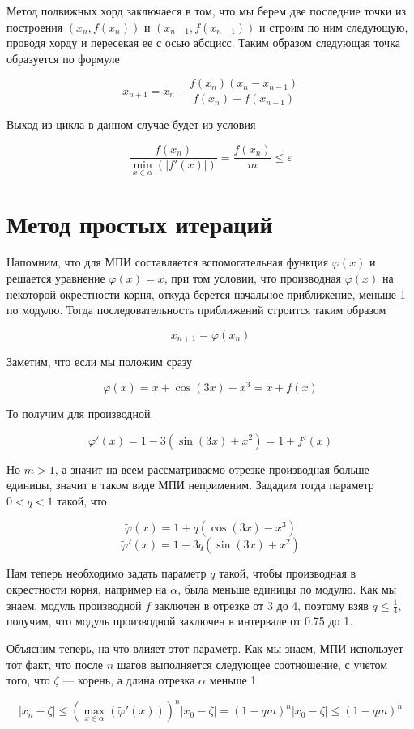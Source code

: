 \documentclass[11pt,a4paper,oneside]{article}
\begin{document}
Метод подвижных хорд заключаеся в том, что мы берем две последние точки из построения $(x_n, f(x_n))$ и $(x_{n - 1}, f(x_{n - 1}))$ и строим по ним следующую, проводя хорду и пересекая ее с осью абсцисс. Таким образом следующая точка образуется по формуле

$$ x_{n + 1} = x_n - \frac{f(x_n) (x_n - x_{n - 1})}{f(x_n) - f(x_{n - 1})} $$

Выход из цикла в данном случае будет из условия

$$ \frac{f(x_n)}{\min_{x \in \alpha}(|f'(x)|)} = \frac{f(x_n)}{m} \le \varepsilon $$

\section{Метод простых итераций}

Напомним, что для МПИ составляется вспомогательная функция $\varphi(x)$ и решается уравнение $\varphi(x) = x$, при том условии, что производная $\varphi(x)$ на некоторой окрестности корня, откуда берется начальное приближение, меньше 1 по модулю. Тогда последовательность приближений строится таким образом

$$ x_{n + 1} = \varphi(x_n) $$

Заметим, что если мы положим сразу

$$ \varphi(x) = x + \cos(3x) - x^3 = x + f(x) $$

То получим для производной

$$ \varphi'(x) = 1 - 3 (\sin(3x) + x^2) = 1 + f'(x) $$

Но $m > 1$, а значит на всем рассматриваемо отрезке производная больше единицы, значит в таком виде МПИ неприменим. Зададим тогда параметр $0 < q < 1$ такой, что

$$ \widetilde{\varphi}(x) = 1 + q (\cos(3x) - x^3) $$
$$ \widetilde{\varphi}'(x) = 1 - 3 q (\sin(3x) + x^2) $$

Нам теперь необходимо задать параметр $q$ такой, чтобы производная в окрестности корня, например на $\alpha$, была меньше единицы по модулю. Как мы знаем, модуль производной $f$ заключен в отрезке от 3 до 4, поэтому взяв $q \le \frac{1}{4}$, получим, что модуль производной заключен в интервале от 0.75 до 1.

Объясним теперь, на что влияет этот параметр. Как мы знаем, МПИ использует тот факт, что после $n$ шагов выполняется следующее соотношение, с учетом того, что $\zeta$ --- корень, а длина отрезка $\alpha$ меньше 1

$$ |x_n - \zeta| \le \left( \max_{x \in \alpha}(\widetilde{\varphi}'(x)) \right)^{n} |x_0 - \zeta|
	= \left(1 - qm\right)^n |x_0 - \zeta| \le (1 - qm)^n $$
	
\end{document}
